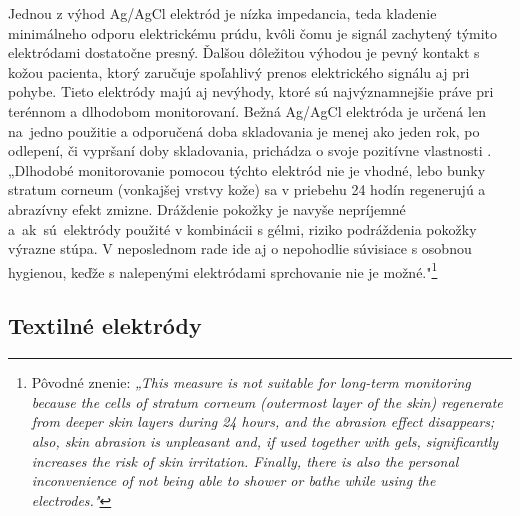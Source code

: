 Jednou z výhod Ag/AgCl elektród je nízka impedancia, teda kladenie minimálneho odporu elektrickému prúdu, kvôli čomu je signál zachytený týmito elektródami dostatočne presný. Ďalšou dôležitou výhodou je pevný kontakt s kožou pacienta, ktorý zaručuje spoľahlivý prenos elektrického signálu aj pri pohybe. Tieto elektródy majú aj nevýhody, ktoré sú najvýznamnejšie práve pri terénnom a dlhodobom monitorovaní. Bežná Ag/AgCl elektróda je určená len na~jedno použitie a odporučená doba skladovania je menej ako jeden rok, po odlepení, či vypršaní doby skladovania, prichádza o svoje pozitívne vlastnosti \cite{Marozas2011}. „Dlhodobé monitorovanie pomocou týchto elektród nie je vhodné, lebo bunky stratum corneum (vonkajšej vrstvy kože) sa v priebehu 24 hodín regenerujú a abrazívny efekt zmizne. Dráždenie pokožky je navyše nepríjemné a~ak~sú~elektródy použité v kombinácii s gélmi, riziko podráždenia pokožky výrazne stúpa. V neposlednom rade ide aj o nepohodlie súvisiace s osobnou hygienou, keďže s nalepenými elektródami sprchovanie nie je možné."\footnote{Pôvodné znenie: \textit{„This measure is not suitable for long-term monitoring because the cells of stratum corneum (outermost layer of the skin) regenerate from deeper skin layers during 24 hours, and the abrasion effect disappears; also, skin abrasion is unpleasant and, if used together with gels, significantly increases the risk of skin irritation. Finally, there is also the personal inconvenience of not being able to shower or bathe while using the electrodes."}} \cite{Marozas2011}

\subsection{Textilné elektródy}

